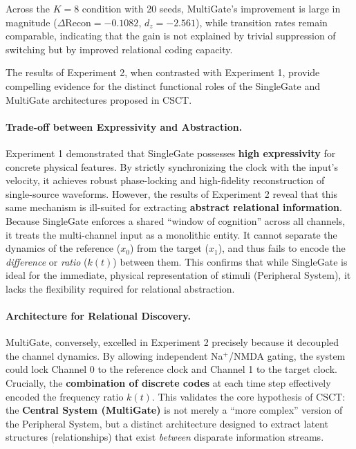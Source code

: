 \documentclass{article}
\begin{document}
Across the $K=8$ condition with 20 seeds, MultiGate's improvement is large in magnitude ($\Delta\mathrm{Recon}=-0.1082$, $d_z=-2.561$), while transition rates remain comparable, indicating that the gain is not explained by trivial suppression of switching but by improved relational coding capacity.

The results of Experiment 2, when contrasted with Experiment 1, provide compelling evidence for the distinct functional roles of the SingleGate and MultiGate architectures proposed in CSCT.

\paragraph{Trade-off between Expressivity and Abstraction.}
Experiment 1 demonstrated that SingleGate possesses \textbf{high expressivity} for concrete physical features. By strictly synchronizing the clock with the input's velocity, it achieves robust phase-locking and high-fidelity reconstruction of single-source waveforms. However, the results of Experiment 2 reveal that this same mechanism is ill-suited for extracting \textbf{abstract relational information}.
Because SingleGate enforces a shared ``window of cognition'' across all channels, it treats the multi-channel input as a monolithic entity. It cannot separate the dynamics of the reference ($x_0$) from the target ($x_1$), and thus fails to encode the \textit{difference} or \textit{ratio} ($k(t)$) between them. This confirms that while SingleGate is ideal for the immediate, physical representation of stimuli (Peripheral System), it lacks the flexibility required for relational abstraction.

\paragraph{Architecture for Relational Discovery.}
MultiGate, conversely, excelled in Experiment 2 precisely because it decoupled the channel dynamics. By allowing independent Na$^+$/NMDA gating, the system could lock Channel 0 to the reference clock and Channel 1 to the target clock. Crucially, the \textbf{combination of discrete codes} at each time step effectively encoded the frequency ratio $k(t)$. 
This validates the core hypothesis of CSCT: the \textbf{Central System (MultiGate)} is not merely a ``more complex'' version of the Peripheral System, but a distinct architecture designed to extract latent structures (relationships) that exist \textit{between} disparate information streams.
\end{document}
